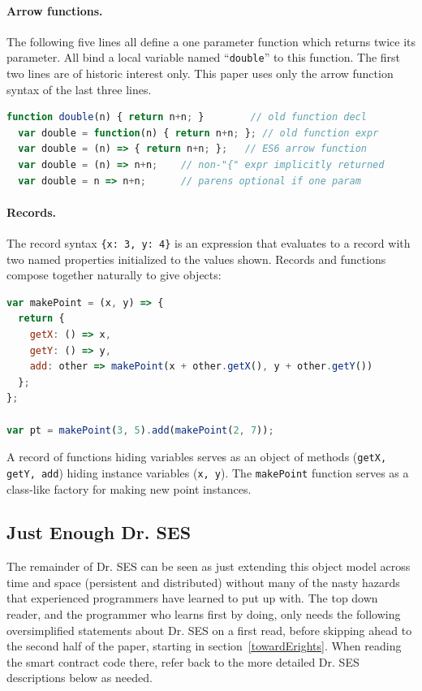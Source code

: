 \documentclass{llncs}
\begin{document}
\paragraph{Arrow functions.} 

The following five lines all define a one parameter function which returns twice its parameter. All bind a local variable named ``{\tt double}'' to this function. The first two lines are of historic interest only. This paper uses only the arrow function syntax of the last three lines.

\begin{lstlisting}[language=JavaScript,numbers=none]
  function double(n) { return n+n; }        // old function decl
  var double = function(n) { return n+n; }; // old function expr
  var double = (n) => { return n+n; };   // ES6 arrow function
  var double = (n) => n+n;    // non-"{" expr implicitly returned
  var double = n => n+n;      // parens optional if one param
\end{lstlisting}

\paragraph{Records.} 

The record syntax {\tt \{x: 3, y: 4\}} is an expression that evaluates to a record with two named properties initialized to the values shown. Records and functions compose together naturally to give objects:

\begin{lstlisting}[language=JavaScript,numbers=none]
var makePoint = (x, y) => {
  return {
    getX: () => x,
    getY: () => y,
    add: other => makePoint(x + other.getX(), y + other.getY())
  };
};

var pt = makePoint(3, 5).add(makePoint(2, 7));
\end{lstlisting}

A record of functions hiding variables serves as an object of methods ({\tt getX, getY, add}) hiding instance variables ({\tt x, y}). The {\tt makePoint} function serves as a class-like factory for making new point instances.

\subsection{Just Enough Dr. SES}

The remainder of Dr. SES can be seen as just extending this object model across time and space (persistent and distributed) without many of the nasty hazards that experienced programmers have learned to put up with. The top down reader, and the programmer who learns first by doing, only needs the following oversimplified statements about Dr. SES on a first read, before skipping ahead to the second half of the paper, starting in section~\ref{towardErights}. When reading the smart contract code there, refer back to the more detailed Dr. SES descriptions below as needed. 
\end{document}
